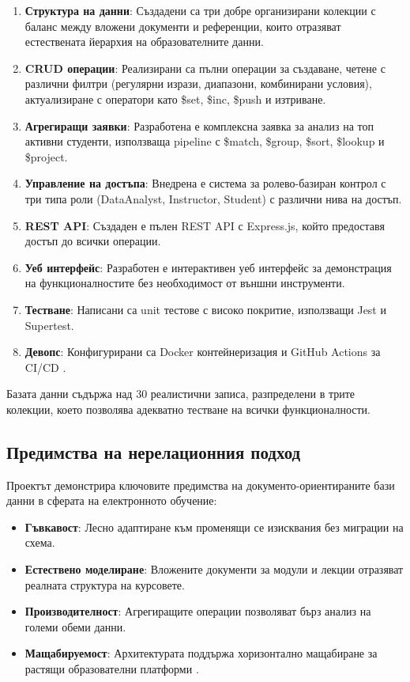\begin{enumerate}
    \item \textbf{Структура на данни}: Създадени са три добре организирани колекции с баланс между вложени документи и референции, които отразяват естествената йерархия на образователните данни.
    \item \textbf{CRUD операции}: Реализирани са пълни операции за създаване, четене с различни филтри (регулярни изрази, диапазони, комбинирани условия), актуализиране с оператори като \$set, \$inc, \$push и изтриване.
    \item \textbf{Агрегиращи заявки}: Разработена е комплексна заявка за анализ на топ активни студенти, използваща pipeline с \$match, \$group, \$sort, \$lookup и \$project.
    \item \textbf{Управление на достъпа}: Внедрена е система за ролево-базиран контрол с три типа роли (DataAnalyst, Instructor, Student) с различни нива на достъп.
    \item \textbf{REST API}: Създаден е пълен REST API с Express.js, който предоставя достъп до всички операции.
    \item \textbf{Уеб интерфейс}: Разработен е интерактивен уеб интерфейс за демонстрация на функционалностите без необходимост от външни инструменти.
    \item \textbf{Тестване}: Написани са unit тестове с високо покритие, използващи Jest и Supertest.
    \item \textbf{Девопс}: Конфигурирани са Docker контейнеризация и GitHub Actions за CI/CD \cite{docker_docs}.
\end{enumerate}

Базата данни съдържа над 30 реалистични записа, разпределени в трите колекции, което позволява адекватно тестване на всички функционалности.

\subsection{Предимства на нерелационния подход}

Проектът демонстрира ключовите предимства на документо-ориентираните бази данни в сферата на електронното обучение:

\begin{itemize}
    \item \textbf{Гъвкавост}: Лесно адаптиране към променящи се изисквания без миграции на схема.
    \item \textbf{Естествено моделиране}: Вложените документи за модули и лекции отразяват реалната структура на курсовете.
    \item \textbf{Производителност}: Агрегиращите операции позволяват бърз анализ на големи обеми данни.
    \item \textbf{Мащабируемост}: Архитектурата поддържа хоризонтално мащабиране за растящи образователни платформи \cite{sharding_pattern}.
\end{itemize}

